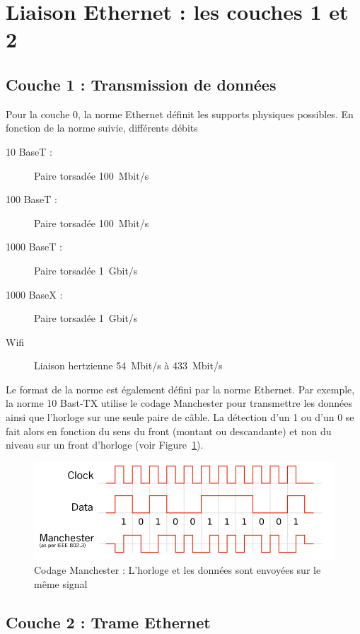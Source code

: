 \FloatBarrier
\section{Liaison Ethernet : les couches 1 et 2}
\subsection{Couche 1 : Transmission de données}
Pour la couche 0, la norme Ethernet définit les supports physiques possibles. En fonction de la norme suivie, différents débits
\begin{description}
  \item [10 BaseT : ] Paire torsadée \SI{100}{Mbit/s}
  \item [100 BaseT : ] Paire torsadée \SI{100}{Mbit/s}
  \item [1000 BaseT : ] Paire torsadée \SI{1}{Gbit/s}
  \item [1000 BaseX : ] Paire torsadée \SI{1}{Gbit/s}
  \item [Wifi] Liaison hertzienne \SI{54}{Mbit/s} à \SI{433}{Mbit/s}
\end{description}

Le format de la norme est également défini par la norme Ethernet. Par exemple, la norme 10 Bast-TX utilise le codage Manchester pour transmettre les données ainsi que l'horloge sur une seule paire de câble. La détection d'un 1 ou d'un 0 se fait alors en fonction du sens du front (montant ou descandante) et non du niveau sur un front d'horloge (voir Figure~\ref{fig:manchesterCode}).

\begin{figure}[h]
  \centering
  \includegraphics[width=.7\textwidth]{../../images/materiel/manchesterCode}
  \caption{Codage Manchester : L'horloge et les données sont envoyées sur le même signal}
  \label{fig:manchesterCode}
\end{figure}

\subsection{Couche 2 : Trame Ethernet}


